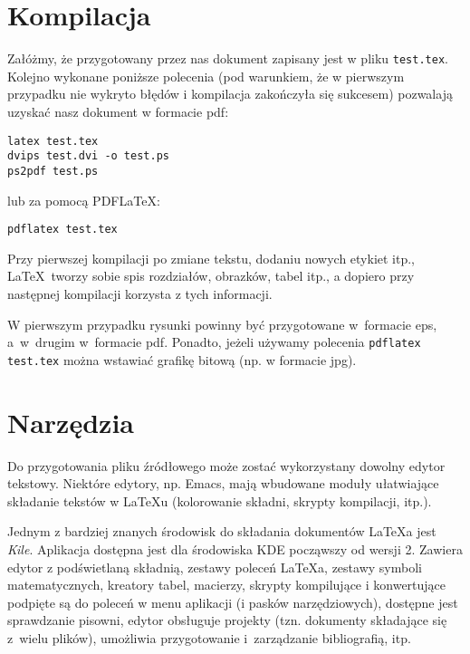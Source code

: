 
\section{Kompilacja}
\label{sec:kompilacja}


Załóżmy, że przygotowany przez nas dokument zapisany jest w pliku \texttt{test.tex}. Kolejno wykonane poniższe polecenia (pod warunkiem, że w pierwszym przypadku nie wykryto błędów i kompilacja zakończyła się sukcesem) pozwalają uzyskać nasz dokument w formacie pdf:
\begin{lstlisting}
latex test.tex
dvips test.dvi -o test.ps
ps2pdf test.ps
\end{lstlisting}
%
lub za pomocą PDF\LaTeX:
\begin{lstlisting}
pdflatex test.tex
\end{lstlisting}

Przy pierwszej kompilacji po zmiane tekstu, dodaniu nowych etykiet itp., \LaTeX~tworzy sobie spis rozdziałów, obrazków, tabel itp., a dopiero przy następnej kompilacji korzysta z tych informacji.

W pierwszym przypadku rysunki powinny być przygotowane w~formacie eps, a~w~drugim w~formacie pdf. Ponadto, jeżeli używamy polecenia \texttt{pdflatex test.tex} można wstawiać grafikę bitową (np. w formacie jpg).




\section{Narzędzia}
\label{sec:narzedzia}


Do przygotowania pliku źródłowego może zostać wykorzystany dowolny edytor tekstowy. Niektóre edytory, np. Emacs, mają wbudowane moduły ułatwiające składanie tekstów w LaTeXu (kolorowanie składni, skrypty kompilacji, itp.).

Jednym z bardziej znanych środowisk do składania dokumentów  \LaTeX a jest {\em Kile}. Aplikacja dostępna jest dla środowiska KDE począwszy od wersji 2. Zawiera edytor z podświetlaną składnią, zestawy poleceń \LaTeX a, zestawy symboli matematycznych, kreatory tabel, macierzy, skrypty kompilujące i konwertujące podpięte są do poleceń w menu aplikacji (i pasków narzędziowych), dostępne jest sprawdzanie pisowni, edytor obsługuje projekty (tzn. dokumenty składające się z~wielu plików), umożliwia przygotowanie i~zarządzanie bibliografią, itp.

